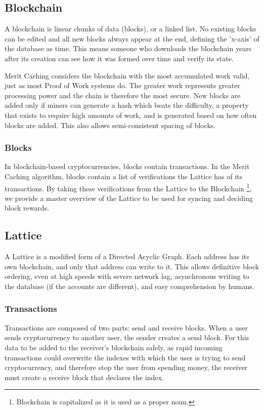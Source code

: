 \documentclass[14pt]{article}
\begin{document}
\label{sec:1.1}
\subsection{Blockchain}
A blockchain is linear chunks of data (blocks), or a linked list. No existing blocks can be edited and all new blocks always appear at the end, defining the 'x-axis' of the database as time. This means someone who downloads the blockchain years after its creation can see how it was formed over time and verify its state. 

Merit Caching considers the blockchain with the most accumulated work valid, just as most Proof of Work systems do. The greater work represents greater processing power and the chain is therefore the most secure. New blocks are added only if miners can generate a hash which beats the difficulty, a property that exists to require high amounts of work, and is generated based on how often blocks are added. This also allows semi-consistent spacing of blocks.

\label{sec:1.1.1}
\subsubsection{Blocks}
In blockchain-based cryptocurrencies, blocks contain transactions. In the Merit Caching algorithm, blocks contain a list of verifications the Lattice has of its transactions. By taking these verifications from the Lattice to the Blockchain \footnote{Blockchain is capitalized as it is used as a proper noun.}, we provide a master overview of the Lattice to be used for syncing and deciding block rewards.

\label{sec:1.2}
\subsection{Lattice}
A Lattice is a modified form of a Directed Acyclic Graph. Each address has its own blockchain, and only that address can write to it. This allows definitive block ordering, even at high speeds with severe network lag, asynchronous writing to the database (if the accounts are different), and easy comprehension by humans.

\label{sec:1.2.1}
\subsubsection{Transactions}
Transactions are composed of two parts: send and receive blocks. When a user sends cryptocurrency to another user, the sender creates a send block. For this data to be added to the receiver's blockchain safely, as rapid incoming transactions could overwrite the indexes with which the user is trying to send cryptocurrency, and therefore stop the user from spending money, the receiver must create a receive block that declares the index.
\end{document}
